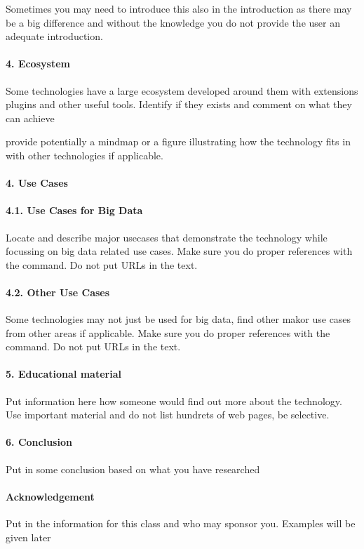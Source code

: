 \documentclass[9pt,twocolumn,twoside]{styles/osajnl}
\begin{document}
Sometimes you may need to introduce this also in the introduction as
there may be a big difference and without the knowledge you do not
provide the user an adequate introduction.

\paragraph{4. Ecosystem}

Some technologies have a large ecosystem developed around them with
extensions plugins and other useful tools. Identify if they exists and
comment on what they can achieve

provide potentially a mindmap or a figure illustrating how the
technology fits in with other technologies if applicable.

\paragraph{4. Use Cases}

\paragraph{4.1. Use Cases  for Big Data}

Locate and describe major usecases that demonstrate the technology
while focussing on big data related use cases. Make sure you do proper
references with the \cite{?} command. Do not put URLs in the text.

\paragraph {4.2. Other Use Cases}

Some technologies may not just be used for big data, find other makor
use cases from other areas if applicable.  Make sure you do proper
references with the \cite{?} command. Do not put URLs in the text.

\paragraph{5. Educational material}

Put information here how someone would find out more about the
technology. Use important material and do not list hundrets of web
pages, be selective.

\paragraph{6. Conclusion}

Put in some conclusion based on what you have researched

\paragraph{Acknowledgement}

Put in the information for this class and who may sponsor
you. Examples will be given later
\end{document}
